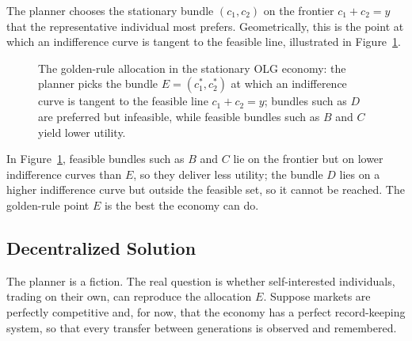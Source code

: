 The planner chooses the stationary bundle $(c_1, c_2)$ on the frontier $c_1 + c_2 = y$ that the representative individual most prefers. Geometrically, this is the point at which an indifference curve is tangent to the feasible line, illustrated in Figure~\ref{fig:money-1}.

\begin{figure}[h]
\centering

\caption{The golden-rule allocation in the stationary OLG economy: the planner picks the bundle $E=(c_1^*,c_2^*)$ at which an indifference curve is tangent to the feasible line $c_1+c_2=y$; bundles such as $D$ are preferred but infeasible, while feasible bundles such as $B$ and $C$ yield lower utility.}
\label{fig:money-1}
\end{figure}


In Figure~\ref{fig:money-1}, feasible bundles such as $B$ and $C$ lie on the frontier but on lower indifference curves than $E$, so they deliver less utility; the bundle $D$ lies on a higher indifference curve but outside the feasible set, so it cannot be reached. The golden-rule point $E$ is the best the economy can do.

\subsection{Decentralized Solution}

The planner is a fiction. The real question is whether self-interested individuals, trading on their own, can reproduce the allocation $E$. Suppose markets are perfectly competitive and, for now, that the economy has a perfect record-keeping system, so that every transfer between generations is observed and remembered.

